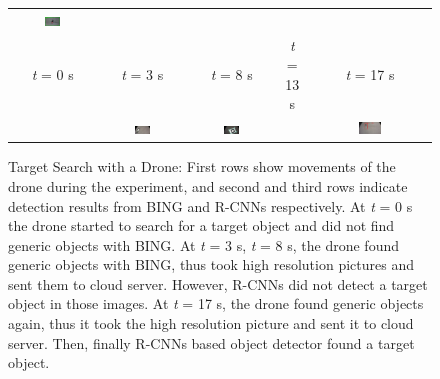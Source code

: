\begin{figure}[th]
\begin{tabular}{@{}c@{\,\,\,}c@{\,\,\,}c@{\,\,\,}c@{\,\,\,}c@{\,\,\,}}
\includegraphics[width=0.2\textwidth]{figures/chapter2/bing_t17} \\
\textit{t} = 0 s &
\textit{t} = 3 s &
\textit{t} = 8 s &
\textit{t} = 13 s&
\textit{t} = 17 s\\
&
\includegraphics[width=0.2\textwidth]{figures/chapter2/front_t3} &
\includegraphics[width=0.2\textwidth]{figures/chapter2/front_t8} &
&
\includegraphics[width=0.2\textwidth]{figures/chapter2/rcnn_result_t17.jpg} \\
\end{tabular}
\caption{Target Search with a Drone: First rows show movements of the drone during the experiment,
and second and third rows indicate detection results from BING and R-CNNs respectively.
At \textit{t} = 0 s the drone started to search for a target object and did not find generic objects with BING.
At \textit{t} = 3 s, \textit{t} = 8 s, the drone found generic objects with BING, thus took high resolution pictures and sent them to cloud server.
However, R-CNNs did not detect a target object in those images.
At \textit{t} = 17 s, the drone found generic objects again, thus it took the high resolution picture and sent it to cloud server.
Then, finally R-CNNs based object detector found a target object.}
\label{fig:searching}
\end{figure}
